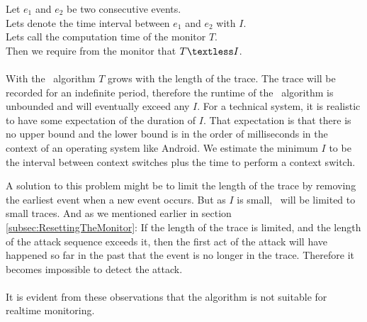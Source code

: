 \indent Let $e_1$ and $e_2$ be two consecutive events.\\
\indent Lets denote the time interval between $e_1$ and $e_2$ with $I$.\\
\indent Lets call the computation time of the monitor $T$.\\
\indent Then we require from the monitor that $T \textless I$.\\
\\
With the \RH\ algorithm $T$ grows with the length of the trace. The trace will be recorded for an indefinite period, therefore the runtime of the \RH\ algorithm is unbounded and will eventually exceed any $I$.  For a technical system, it is realistic to have some expectation of the duration of $I$. That expectation is that there is no upper bound and the lower bound is in the order of milliseconds in the context of an operating system like Android. We estimate the minimum $I$ to be the interval between context switches plus the time to perform a context switch.

A solution to this problem might be to limit the length of the trace by removing the earliest event when a new event occurs.  But as $I$ is small, \RH\ will be limited to small traces.  And as we mentioned earlier in section \ref{subsec:ResettingTheMonitor}: If the length of the trace is limited, and the length of the attack sequence exceeds it, then the first act of the attack will have happened so far in the past that the event is no longer in the trace.  Therefore it becomes impossible to detect the attack.\\
\\
It is evident from these observations that the algorithm is not suitable for realtime monitoring.\\

%
